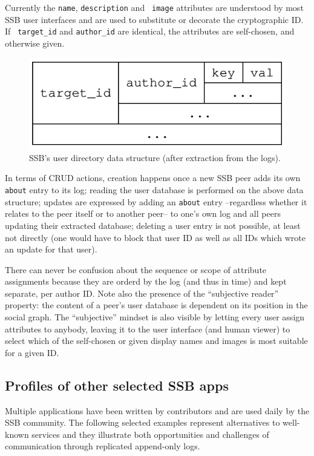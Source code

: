 \documentclass[9pt,sigconf,rewiew]{acmart}
\begin{document}
Currently the {\small\tt name}, {\small\tt description} and {\small\tt
  image} attributes are understood by most SSB user interfaces and are
used to substitute or decorate the cryptographic ID. If {\small\tt
  target\_id} and {\small\tt author\_id} are identical, the
attributes are self-chosen, and otherwise given.

\begin{figure}[htb]
  \includegraphics[width=0.6\columnwidth]{figs/about-ds.pdf}
  \caption{SSB's user directory data structure (after extraction from the logs).}
  \label{fig:about}
\end{figure}

\noindent
In terms of CRUD actions, creation happens once a new SSB peer adds
its own {\small\tt about} entry to its log; reading the user database
is performed on the above data structure; updates are expressed by
adding an {\small\tt about} entry --regardless whether it relates to
the peer itself or to another peer-- to one's own log and all peers
updating their extracted database; deleting a user entry is not
possible, at least not directly (one would have to block that user ID
as well as all IDs which wrote an update for that user).

There can never be confusion about the sequence or scope of attribute
assignments because they are orderd by the log (and thus in time) and
kept separate, per author ID. Note also the presence of the
``subjective reader'' property: the content of a peer's user database
is dependent on its position in the social graph. The ``subjective''
mindset is also visible by letting every user assign attributes to
anybody, leaving it to the user interface (and human viewer) to select
which of the self-chosen or given display names and images is most suitable
for a given ID.

\subsection{Profiles of other selected SSB apps}
\label{Section:AppProfiles}

Multiple applications have been written by contributors and are used daily by
the SSB community. The following selected examples represent
alternatives to well-known services and they illustrate both opportunities and
challenges of communication through replicated append-only logs.
\end{document}
